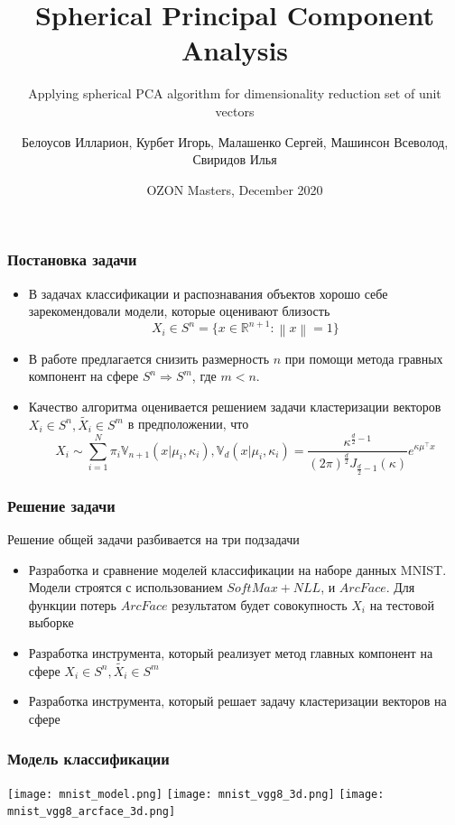 \documentclass{beamer}
\title[Spherical Principal Component Analysis]{Spherical Principal Component Analysis}
\subtitle{Applying spherical PCA algorithm for dimensionality reduction set of unit vectors}
\author[] { Белоусов Илларион, Курбет Игорь, Малашенко Сергей, Машинсон Всеволод, Свиридов Илья }
\date[]{OZON Masters, December 2020}
\begin{document}
\frame{\titlepage}

\begin{frame}
\frametitle{Постановка задачи}
\begin{itemize}
 \item В задачах классификации и распознавания объектов хорошо себе зарекомендовали модели, которые оценивают близость 
 $$X_i \in S^n = \{ x \in \mathbb{R}^{n+1} : \left\lVert x \right\rVert=1 \}$$
 \item В работе предлагается снизить размерность $n$ при помощи метода гравных компонент на сфере $S^n \Rightarrow S^m$, где $m < n$.
 \item Качество алгоритма оценивается решением задачи кластеризации векторов $X_i \in S^n, \tilde{X_i} \in S^m$ в предположении, что $$X_i \sim \sum_{i=1}^{N}\pi_i \mathbb{V}_{n+1}(x | \mu_i, \kappa_i), \mathbb{V}_d(x | \mu_i, \kappa_i)=\frac{\kappa^{\frac{d}{2}-1}}{(2\pi)^{\frac{d}{2}}J_{\frac{d}{2}-1}(\kappa)} e^{\kappa \mu^{\top} x}$$
\end{itemize}
\end{frame}

\begin{frame}
\frametitle{Решение задачи}
Решение общей задачи разбивается на три подзадачи
\begin{itemize}
 \item Разработка и сравнение моделей классификации на наборе данных MNIST. Модели строятся с использованием $SoftMax + NLL$, и $ArcFace$. Для функции потерь $ArcFace$ результатом будет совокупность $X_i$ на тестовой выборке
\item Разработка инструмента, который реализует метод главных компонент на сфере $X_i \in S^n, \tilde{X_i} \in S^m$
\item Разработка инструмента, который решает задачу кластеризации векторов на сфере
\end{itemize}

\end{frame}

\begin{frame}
\frametitle{Модель классификации}
\texttt{[image: mnist\_model.png]}
\texttt{[image: mnist\_vgg8\_3d.png]}
\texttt{[image: mnist\_vgg8\_arcface\_3d.png]}
\end{frame}
\end{document}
